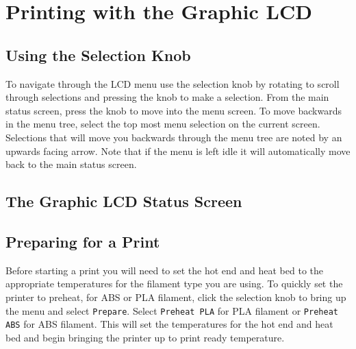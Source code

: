 \section{Printing with the Graphic LCD}
\subsection{Using the Selection Knob}
To navigate through the LCD menu use the selection knob by rotating to scroll through selections and pressing the knob to make a selection. From the main status screen, press the knob to move into the menu screen. To move backwards in the menu tree, select the top most menu selection on the current screen. Selections that will move you backwards through the menu tree are noted by an upwards facing arrow. Note that if the menu is left idle it will automatically move back to the main status screen.

\subsection{The Graphic LCD Status Screen}


\subsection{Preparing for a Print}
Before starting a print you will need to set the hot end and heat bed to the appropriate temperatures for the filament type you are using. To quickly set the printer to preheat, for ABS or PLA filament, click the selection knob to bring up the menu and select \texttt{Prepare}. Select \texttt{Preheat PLA} for PLA filament or \texttt{Preheat ABS} for ABS filament. This will set the temperatures for the hot end and heat bed and begin bringing the printer up to print ready temperature.

